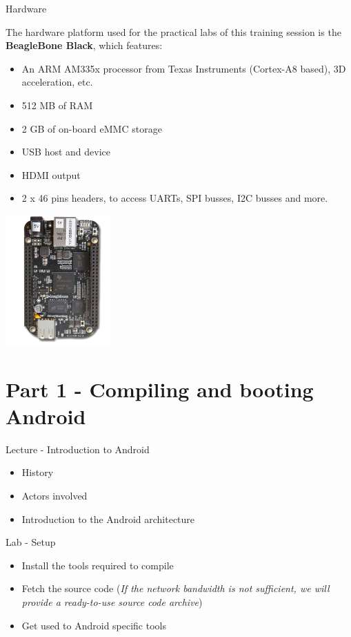 \documentclass[a4paper,12pt,obeyspaces,spaces,hyphens]{article}
\begin{document}
\feagendatwocolumn
{Hardware}
{
  The hardware platform used for the practical labs of this training
  session is the {\bf BeagleBone Black}, which features:

  \begin{itemize}
  \item An ARM AM335x processor from Texas Instruments (Cortex-A8
    based), 3D acceleration, etc.
  \item 512 MB of RAM
  \item 2 GB of on-board eMMC storage
  \item USB host and device
  \item HDMI output
  \item 2 x 46 pins headers, to access UARTs, SPI busses, I2C busses
    and more.
  \end{itemize}
}
{}
{
  \begin{center}
    \includegraphics[height=5cm]{agenda/beagleboneblack.png}
  \end{center}
}

\section{Part 1 - Compiling and booting Android}

\feagendatwocolumn
{Lecture - Introduction to Android}
{
  \begin{itemize}
  \item History
  \item Actors involved
  \item Introduction to the Android architecture
  \end{itemize}
}
{Lab - Setup}
{
  \begin{itemize}
  \item Install the tools required to compile
  \item Fetch the source code (\textit{If the network bandwidth is not
      sufficient, we will provide a ready-to-use source code archive})
  \item Get used to Android specific tools
  \end{itemize}
}
\end{document}
